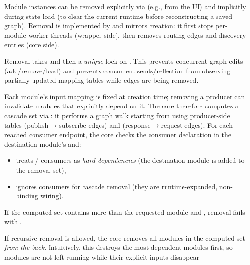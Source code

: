 Module instances can be removed explicitly via  (e.g., from the UI) and implicitly during state load (to clear the current runtime before reconstructing a saved graph).
Removal is implemented by  and mirrors creation: it first stops per-module worker threads (wrapper side), then removes routing edges and discovery entries (core side).

Removal takes  and then a \emph{unique} lock on .
This prevents concurrent graph edits (add/remove/load) and prevents concurrent sends/reflection from observing partially updated mapping tables while edges are being removed.

Each module's input mapping is fixed at creation time; removing a producer can invalidate modules that explicitly depend on it.
The core therefore computes a cascade set via :
it performs a graph walk starting from  using producer-side tables  (publish$\rightarrow$subscribe edges) and  (response$\rightarrow$request edges).
For each reached consumer endpoint, the core checks the consumer declaration in the destination module's  and:
\begin{itemize}
    \item treats / consumers as \emph{hard dependencies} (the destination module is added to the removal set),
    \item ignores  consumers for cascade removal (they are runtime-expanded, non-binding wiring).
\end{itemize}
If the computed set contains more than the requested module and , removal fails with .

If recursive removal is allowed, the core removes all modules in the computed set \emph{from the back}.
Intuitively, this destroys the most dependent modules first, so modules are not left running while their explicit inputs disappear.

